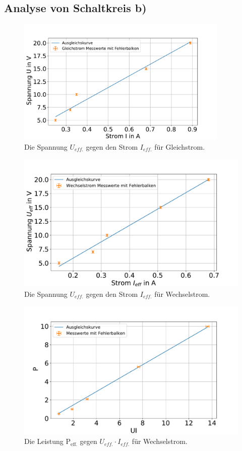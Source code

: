 \subsection{Analyse von Schaltkreis b)}
\begin{figure}[h]
	\centering
	\includegraphics[width=0.9\textwidth]{res/UgegenI_GL.pdf}
	\caption{Die Spannung $U_{eff.}$ gegen den Strom $I_{eff.}$ für Gleichstrom.}
	\label{fig:UgegenIgl}
\end{figure}
\begin{figure}[h]
	\centering
	\includegraphics[width=0.9\linewidth]{res/UgegenI_W.pdf}
	\caption{Die Spannung $U_{eff.}$ gegen den Strom $I_{eff.}$ für Wechselstrom.}
	\label{fig:UgegenIw}
\end{figure}
\begin{figure}[h]
	\centering
	\includegraphics[width=0.9\linewidth]{res/PgegenUI.pdf}
	\caption{Die Leistung P$_\text{eff.}$ gegen $U_{eff.} \cdot I_{eff.}$ für Wechselstrom.}
	\label{fig:PgegenUI}
\end{figure}

